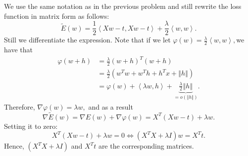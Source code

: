 
We use the same notation as in the previous problem and still rewrite
the loss function in matrix form as follows: 
\[
\widetilde{E}(w)=\frac{1}{2}\left\langle Xw-t,Xw-t\right\rangle +\frac{\lambda}{2}\left\langle w,w\right\rangle .
\]
Still we differentiate the expression. Note that if we let $\varphi(w)=\frac{\lambda}{2}\left\langle w,w\right\rangle ,$we
have that 
\begin{align*}
\varphi(w+h) & =\frac{\lambda}{2}\left(w+h\right)^{T}\left(w+h\right)\\
 & =\frac{\lambda}{2}\left(w^{T}w+w^{T}h+h^{T}x+\left\Vert h\right\Vert \right)\\
 & =\varphi\left(w\right)+\left\langle \lambda w,h\right\rangle +\underbrace{\frac{\lambda}{2}\left\Vert h\right\Vert }_{=o(\left\Vert h\right\Vert )}.
\end{align*}
Therefore, $\nabla\varphi(w)=\lambda w,$ and as a result 
\[
\nabla\widetilde{E}(w)=\nabla E(w)+\nabla\varphi(w)=X^{T}(Xw-t)+\lambda w.
\]
Setting it to zero: 
\[
X^{T}(Xw-t)+\lambda w=0\iff(X^{T}X+\lambda I)w=X^{T}t.
\]
Hence, $(X^{T}X+\lambda I)$ and $X^{T}t$ are the corresponding matrices. 


